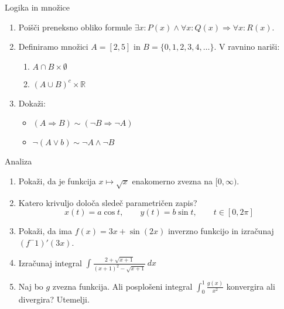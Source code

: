 \begin{frame}{Logika in množice}
	\begin{enumerate}
		\item
		Poišči preneksno obliko formule $\exists x : P(x) \land \forall x : Q(x) \Rightarrow \forall x : R(x)$.
		\item 
		Definiramo množici $A = [2,5]$ in $B = \{0,1,2,3,4, \ldots\}$.
		V ravnino nariši:
		\begin{enumerate}
		   \item $A \cap B \times \emptyset$
		   \item $(A \cup B)^c \times \mathbb{R}$
		\end{enumerate}
		\item
		Dokaži:
		\begin{itemize}
			\item $(A \Rightarrow B) \sim (\neg B \Rightarrow \neg A)$
			\item $\neg(A \lor b) \sim \neg A \land \neg B$
		\end{itemize}
	\end{enumerate}
\end{frame}



\begin{frame}{Analiza}
	\begin{enumerate}
		\item
		Pokaži, da je funkcija $x \mapsto\sqrt{x}$ enakomerno zvezna na $[0,\infty)$.
		\item 
		Katero krivuljo določa sledeč parametričen zapis?
		$$
		   x(t) = a \cos t, \qquad %
		   y(t) = b \sin t, \qquad %
		   t \in [0, 2 \pi]
		$$ 
		\item
		Pokaži, da ima $f(x)=3x + \sin(2x)$ inverzno funkcijo in izračunaj $(f^-1)'(3x)$.
		
		\item
		Izračunaj integral 
		$ \displaystyle{\int \frac{2+\sqrt{x+1}}{(x+1)^2-\sqrt{x+1}}} \,dx $
		\item 
		Naj bo $g$ zvezna funkcija. Ali posplošeni integral 
		$\int_{0}^{1} \frac{g(x)}{x^2}$
		konvergira ali divergira? Utemelji.
	\end{enumerate}
\end{frame}

